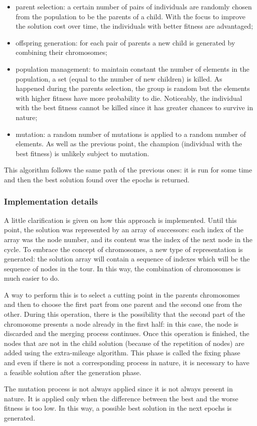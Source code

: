 \begin{itemize}
	\item parent selection: a certain number of pairs of individuals are randomly chosen from the population to be the parents of a child. With the focus to improve the solution cost over time, the individuals with better fitness are advantaged;
	\item offspring generation: for each pair of parents a new child is generated by combining their chromosomes;
	\item population management: to maintain constant the number of elements in the population, a set (equal to the number of new children) is killed. As happened during the parents selection, the group is random but the elements with higher fitness have more probability to die. Noticeably, the individual with the best fitness cannot be killed since it has greater chances to survive in nature;
	\item mutation: a random number of mutations is applied to a random number of elements. As well as the previous point, the champion (individual with the best fitness) is unlikely subject to mutation.
\end{itemize}

This algorithm follows the same path of the previous ones: it is run for some time and then the best solution found over the epochs is returned.

\subsubsection{Implementation details}
\label{sec:implementation-genetic}
A little clarification is given on how this approach is implemented. Until this point, the solution was represented by an array of successors: each index of the array was the node number, and its content was the index of the next node in the cycle. To embrace the concept of chromosomes, a new type of representation is generated: the solution array will contain a sequence of indexes which will be the sequence of nodes in the tour. In this way, the combination of chromosomes is much easier to
do. 

A way to perform this is to select a cutting point in the parents chromosomes and then to choose the first part from one parent and the second one from the other. During this operation, there is the possibility that the second part of the chromosome presents a node already in the first half: in this case, the node is discarded and the merging process continues. Once this operation is finished, the nodes that are not in the child solution (because of the repetition of nodes) are added using the extra-mileage algorithm. This phase is called the fixing phase and even if there is not a corresponding process in nature, it is necessary to have a feasible solution after the generation phase.

The mutation process is not always applied since it is not always present in nature. It is applied only when the difference between the best and the worse fitness is too low. In this way, a possible best solution in the next epochs is generated.

